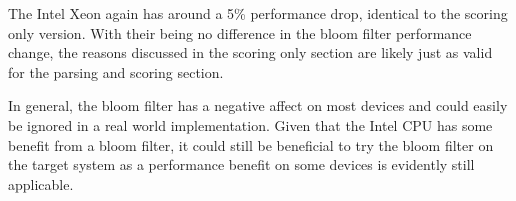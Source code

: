 The Intel Xeon again has around a 5\% performance drop, identical to the scoring
only version. With their being no difference in the bloom filter performance
change, the reasons discussed in the scoring only section are likely just as
valid for the parsing and scoring section.

In general, the bloom filter has a negative affect on most devices and could
easily be ignored in a real world implementation. Given that the Intel CPU
has some benefit from a bloom filter, it could still be beneficial to try the
bloom filter on the target system as a performance benefit on some devices is
evidently still applicable.

